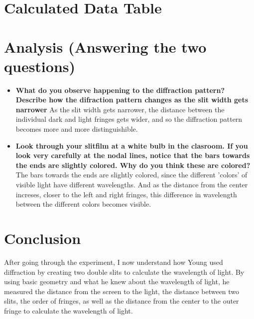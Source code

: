 \documentclass[12pt]{article}
\begin{document}
\section{Calculated Data Table}

\begin{table}[H]
	\def\arraystretch{1.5}
\end{table}

\section{Analysis (Answering the two questions)}


\begin{itemize}
	\item \textbf{What do you observe happening to the diffraction pattern? Describe how the difraction pattern changes as the slit width gets narrower}
	      \subitem As the slit width gets narrower, the distance between the individual dark and light fringes gets wider, and so the diffraction pattern becomes more and more distinguishible.
	\item \textbf{Look through your slitfilm at a white bulb in the clasroom. If you look very carefully at the nodal lines, notice that the bars towards the ends are slightly colored. Why do you think these are colored?}
	      \subitem The bars towards the ends are slightly colored, since the different 'colors' of visible light have different wavelengths. And as the distance from the center increses, closer to the left and right fringes, this difference in wavelength between the different colors becomes visible.
\end{itemize}

\section{Conclusion}

After going through the experiment, I now understand how Young used diffraction by creating two double slits to calculate the wavelength of light. By using basic geometry and what he knew about the wavelength of light, he measured the distance from the screen to the light, the distance between two slits, the order of fringes, as well as the distance from the center to the outer fringe to calculate the wavelength of light.
\end{document}
